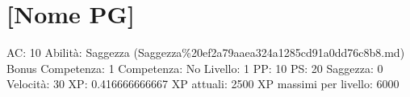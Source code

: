\section{{[}Nome PG{]}}\label{nome-pg}

AC: 10 Abilità: Saggezza
(Saggezza\%20ef2a79aaea324a1285cd91a0dd76c8b8.md) Bonus Competenza: 1
Competenza: No Livello: 1 PP: 10 PS: 20 Saggezza: 0 Velocità: 30 XP:
0.416666666667 XP attuali: 2500 XP massimi per livello: 6000
